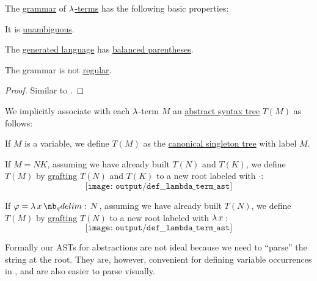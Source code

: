 \begin{proposition}\label{thm:lambda_term_grammar}
  The \hyperref[def:formal_grammar]{grammar} of \hyperref[def:lambda_term]{\( \mathrm{\lambda} \)-terms} has the following basic properties:
  \begin{thmenum}
     It is \hyperref[def:grammar_ambiguity]{unambiguous}.

     The \hyperref[def:formal_grammar/language]{generated language} has \hyperref[def:paired_delimiters]{balanced parentheses}.

     The grammar is not \hyperref[def:formal_grammar/regular]{regular}.
  \end{thmenum}
\end{proposition}
\begin{proof}
  Similar to .
\end{proof}

\begin{definition}\label{def:lambda_term_ast}
  We implicitly associate with each \( \mathrm{\lambda} \)-term \( M \) an \hyperref[con:abstract_syntax_tree]{abstract syntax tree} \( T(M) \) as follows:
  \begin{thmenum}
     If \( M \) is a variable, we define \( T(M) \) as the \hyperref[def:canonical_singleton_tree]{canonical singleton tree} with label \( M \).

     If \( M = NK \), assuming we have already built \( T(N) \) and \( T(K) \), we define \( T(M) \) by \hyperref[def:ordered_tree_grafting_product]{grafting} \( T(N) \) and \( T(K) \) to a new root labeled with \( \cdot \):
    \begin{equation*}
      \texttt{[image: output/def\_\_lambda\_term\_ast]}
    \end{equation*}

     If \( \varphi = \qabs x N \), assuming we have already built \( T(N) \), we define \( T(M) \) by \hyperref[def:ordered_tree_grafting_product]{grafting} \( T(N) \) to a new root labeled with \( \qabs* x \):
    \begin{equation*}
      \texttt{[image: output/def\_\_lambda\_term\_ast]}
    \end{equation*}
  \end{thmenum}
\end{definition}
\begin{comments}
  \item Formally our ASTs for abstractions are not ideal because we need to \enquote{parse} the string at the root. They are, however, convenient for defining variable occurrences in , and are also easier to parse visually.
\end{comments}

